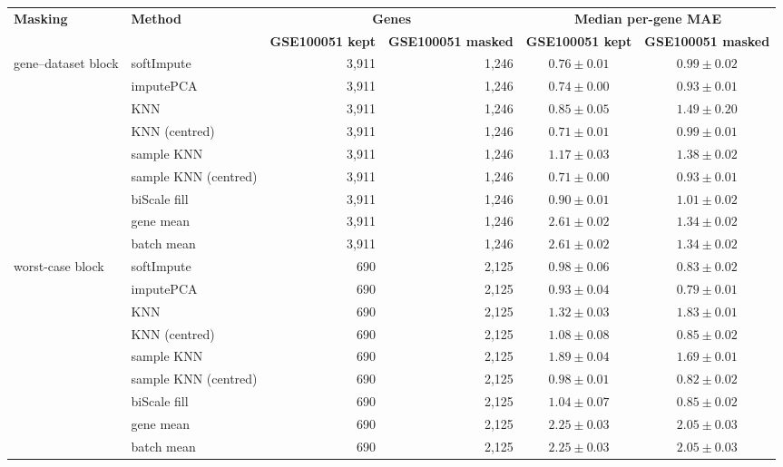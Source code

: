 \begin{tabular}{@{}llrrcc@{}}
\toprule
\textbf{Masking} & \textbf{Method} & \multicolumn{2}{c}{\textbf{Genes}} & \multicolumn{2}{c}{\textbf{Median per-gene MAE}} \\
\cmidrule(lr){3-4}\cmidrule(lr){5-6}
 & & \textbf{GSE100051 kept} & \textbf{GSE100051 masked} & \textbf{GSE100051 kept} & \textbf{GSE100051 masked} \\
\midrule
gene--dataset block & softImpute & 3{,}911 & 1{,}246 & $0.76 \pm 0.01$ & $0.99 \pm 0.02$ \\
 & imputePCA & 3{,}911 & 1{,}246 & $0.74 \pm 0.00$ & $0.93 \pm 0.01$ \\
 & KNN & 3{,}911 & 1{,}246 & $0.85 \pm 0.05$ & $1.49 \pm 0.20$ \\
 & KNN (centred) & 3{,}911 & 1{,}246 & $0.71 \pm 0.01$ & $0.99 \pm 0.01$ \\
 & sample KNN & 3{,}911 & 1{,}246 & $1.17 \pm 0.03$ & $1.38 \pm 0.02$ \\
 & sample KNN (centred) & 3{,}911 & 1{,}246 & $0.71 \pm 0.00$ & $0.93 \pm 0.01$ \\
 & biScale fill & 3{,}911 & 1{,}246 & $0.90 \pm 0.01$ & $1.01 \pm 0.02$ \\
 & gene mean & 3{,}911 & 1{,}246 & $2.61 \pm 0.02$ & $1.34 \pm 0.02$ \\
 & batch mean & 3{,}911 & 1{,}246 & $2.61 \pm 0.02$ & $1.34 \pm 0.02$ \\
\addlinespace
worst-case block & softImpute & 690 & 2{,}125 & $0.98 \pm 0.06$ & $0.83 \pm 0.02$ \\
 & imputePCA & 690 & 2{,}125 & $0.93 \pm 0.04$ & $0.79 \pm 0.01$ \\
 & KNN & 690 & 2{,}125 & $1.32 \pm 0.03$ & $1.83 \pm 0.01$ \\
 & KNN (centred) & 690 & 2{,}125 & $1.08 \pm 0.08$ & $0.85 \pm 0.02$ \\
 & sample KNN & 690 & 2{,}125 & $1.89 \pm 0.04$ & $1.69 \pm 0.01$ \\
 & sample KNN (centred) & 690 & 2{,}125 & $0.98 \pm 0.01$ & $0.82 \pm 0.02$ \\
 & biScale fill & 690 & 2{,}125 & $1.04 \pm 0.07$ & $0.85 \pm 0.02$ \\
 & gene mean & 690 & 2{,}125 & $2.25 \pm 0.03$ & $2.05 \pm 0.03$ \\
 & batch mean & 690 & 2{,}125 & $2.25 \pm 0.03$ & $2.05 \pm 0.03$ \\
\bottomrule
\end{tabular}
